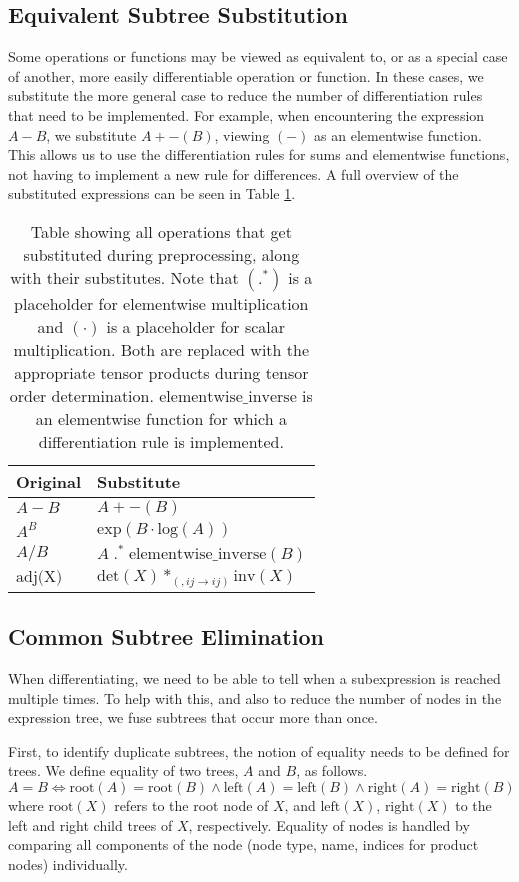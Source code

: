 \documentclass[12pt, a4paper]{report}
\begin{document}
\subsection{Equivalent Subtree Substitution}
Some operations or functions may be viewed as equivalent to, or as a special case of another, more easily differentiable operation or function.
In these cases, we substitute the more general case to reduce the number of differentiation rules that need to be implemented.
For example, when encountering the expression $A - B$, we substitute $A + -(B)$, viewing $(-)$ as an elementwise function.
This allows us to use the differentiation rules for sums and elementwise functions, not having to implement a new rule for differences.
A full overview of the substituted expressions can be seen in Table \ref{tab:substitutions}.
\begin{table}[ht]
    \centering
    \begin{tabular}{l | l}
        Original & Substitute \\\hline
        $A-B$ & $A + -(B)$ \\
        $A^B$ & $\text{exp}(B \cdot \text{log}(A))$ \\
        $A/B$ & $A \;.^*\; \text{elementwise\_inverse}(B)$ \\
        $\text{adj(X)}$ & $\text{det}(X) *_{(,ij \rightarrow ij)} \text{inv}(X)$ \\ 
    \end{tabular}
    \caption{Table showing all operations that get substituted during preprocessing, along with their substitutes. Note that $(.^*)$ is a placeholder for elementwise multiplication and $(\cdot)$ is a placeholder for scalar multiplication. Both are replaced with the appropriate tensor products during tensor order determination. $\text{elementwise\_inverse}$ is an elementwise function for which a differentiation rule is implemented.}
    \label{tab:substitutions}
\end{table}
\FloatBarrier

\subsection{Common Subtree Elimination}
When differentiating, we need to be able to tell when a subexpression is reached multiple times.
To help with this, and also to reduce the number of nodes in the expression tree, we fuse subtrees that occur more than once.

First, to identify duplicate subtrees, the notion of equality needs to be defined for trees.
We define equality of two trees, $A$ and $B$, as follows.
$$
A = B \iff \text{root}(A) = \text{root}(B) \land \text{left}(A) = \text{left}(B) \land \text{right}(A) = \text{right}(B)
$$
where $\text{root}(X)$ refers to the root node of $X$, and $\text{left}(X)$, $\text{right}(X)$ to the left and right child trees of $X$, respectively.
Equality of nodes is handled by comparing all components of the node (node type, name, indices for product nodes) individually.
\end{document}
